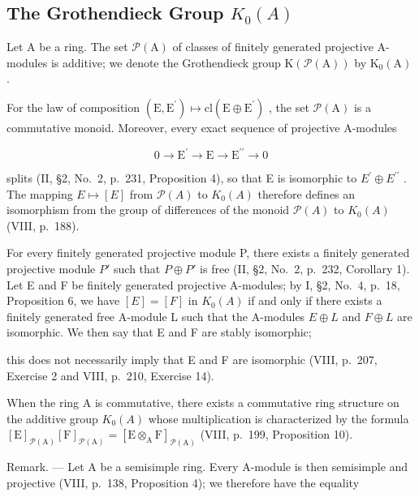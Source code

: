 \subsection{\texorpdfstring{The Grothendieck Group \(K_{0}(A)\)}{The Grothendieck Group K\_\{0\}(A)}}

Let \(\mathrm{A}\) be a ring. The set \(\mathcal{P}(\mathrm{A})\) of classes of finitely generated projective A-modules is additive; we denote the Grothendieck group \(\mathrm{K}(\mathcal{P}(\mathrm{A}))\) by \(\mathrm{K}_0(\mathrm{A})\) .

For the law of composition \((\mathrm{E},\mathrm{E}^{\prime})\mapsto\mathrm{cl}(\mathrm{E}\oplus\mathrm{E}^{\prime})\) , the set \(\mathcal{P}(\mathrm{A})\) is a commutative monoid. Moreover, every exact sequence of projective A-modules

\[
0 \longrightarrow \mathrm{E} ^ {\prime} \longrightarrow \mathrm{E} \longrightarrow \mathrm{E} ^ {\prime \prime} \longrightarrow 0
\]

splits (II, §2, No.~2, p.~231, Proposition 4), so that E is isomorphic to \(E^{\prime} \oplus E^{\prime\prime}\) . The mapping \(E \mapsto [E]\) from \(\mathcal{P}(A)\) to \(K_{0}(A)\) therefore defines an isomorphism from the group of differences of the monoid \(\mathcal{P}(A)\) to \(K_{0}(A)\) (VIII, p.~188).

For every finitely generated projective module P, there exists a finitely generated projective module \(P'\) such that \(P \oplus P'\) is free (II, §2, No.~2, p.~232, Corollary 1). Let E and F be finitely generated projective A-modules; by I, §2, No.~4, p.~18, Proposition 6, we have \([E] = [F]\) in \(K_{0}(A)\) if and only if there exists a finitely generated free A-module L such that the A-modules \(E \oplus L\) and \(F \oplus L\) are isomorphic. We then say that E and F are stably isomorphic;

this does not necessarily imply that E and F are isomorphic (VIII, p.~207, Exercise 2 and VIII, p.~210, Exercise 14).

When the ring A is commutative, there exists a commutative ring structure on the additive group \(K_{0}(A)\) whose multiplication is characterized by the formula \([\mathrm{E}]_{\mathcal{P}(\mathrm{A})}[\mathrm{F}]_{\mathcal{P}(\mathrm{A})} = [\mathrm{E} \otimes_{\mathrm{A}} \mathrm{F}]_{\mathcal{P}(\mathrm{A})}\) (VIII, p.~199, Proposition 10).

Remark. --- Let A be a semisimple ring. Every A-module is then semisimple and projective (VIII, p.~138, Proposition 4); we therefore have the equality

